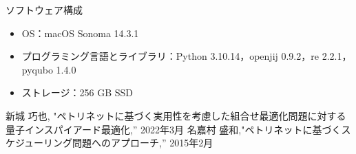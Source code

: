 \documentclass[conference]{IEEEtran}
\begin{document}
\vspace{\baselineskip}

ソフトウェア構成 
\begin{itemize}
\item OS：macOS Sonoma 14.3.1
\item プログラミング言語とライブラリ：Python 3.10.14，openjij 0.9.2，re 2.2.1，pyqubo 1.4.0
\item ストレージ：256 GB SSD
\end{itemize}



\begin{thebibliography}{00}
 新城 巧也, "ペトリネットに基づく実用性を考慮した組合せ最適化問題に対する量子インスパイアード最適化,'' 2022年3月
名嘉村 盛和,"ペトリネットに基づくスケジューリング問題へのアプローチ,'' 2015年2月
\end{thebibliography}
\end{document}
